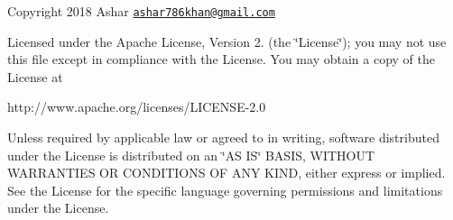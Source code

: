 Copyright 2018 Ashar \href{mailto:ashar786khan@gmail.com}{\tt ashar786khan@gmail.\+com}

Licensed under the Apache License, Version 2. (the \char`\"{}\+License\char`\"{}); you may not use this file except in compliance with the License. You may obtain a copy of the License at \begin{DoxyVerb}http://www.apache.org/licenses/LICENSE-2.0
\end{DoxyVerb}


Unless required by applicable law or agreed to in writing, software distributed under the License is distributed on an \char`\"{}\+A\+S I\+S\char`\"{} B\+A\+S\+IS, W\+I\+T\+H\+O\+UT W\+A\+R\+R\+A\+N\+T\+I\+ES OR C\+O\+N\+D\+I\+T\+I\+O\+NS OF A\+NY K\+I\+ND, either express or implied. See the License for the specific language governing permissions and limitations under the License. 